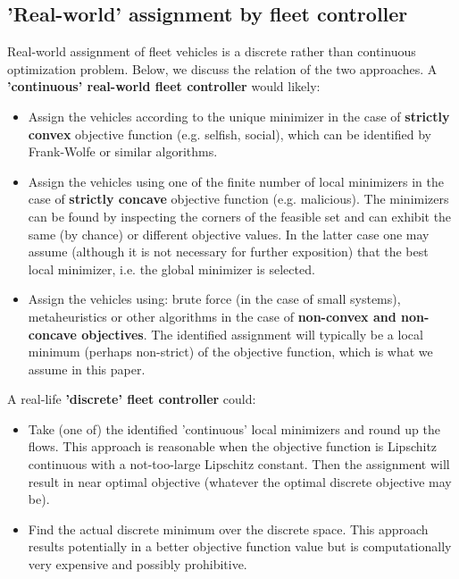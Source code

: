 \documentclass[a4paper,11pt]{article}
\begin{document}
\subsection{'Real-world' assignment by fleet controller}
\label{Sec_realworld}
Real-world assignment of fleet vehicles is a discrete rather than continuous optimization problem. Below, we discuss the relation of the two approaches. A {\bf 'continuous' real-world fleet controller} would likely:
\begin{itemize}
\item Assign the vehicles according to the unique minimizer in the case of {\bf strictly convex} objective function (e.g. selfish, social), which can be identified by Frank-Wolfe or similar algorithms. 
\item Assign the vehicles using one of the finite number of local minimizers in the case of {\bf strictly concave} objective function (e.g. malicious). The minimizers can be found by inspecting the corners of the feasible set and can exhibit the same (by chance) or different objective values. In the latter case one may assume (although it is not necessary for further exposition) that the best local minimizer, i.e. the global minimizer is selected. 
\item Assign the vehicles using: brute force (in the case of small systems), metaheuristics \cite{Metaheuristics} or other algorithms in the case of {\bf non-convex and non-concave objectives}. The identified assignment will typically be a local minimum (perhaps non-strict) of the objective function, which is what we assume in this paper.  
\end{itemize}

\noindent A real-life {\bf 'discrete' fleet controller} could:
\begin{itemize}
\item Take (one of) the identified 'continuous' local minimizers and round up the flows. This approach is reasonable when the objective function is Lipschitz continuous with a not-too-large Lipschitz constant. Then the assignment will result in near optimal objective (whatever the optimal discrete objective may be). 

\item Find the actual discrete minimum over the discrete space. This approach results potentially in a better objective function value but is computationally very expensive and possibly prohibitive.
\end{itemize}
\end{document}
